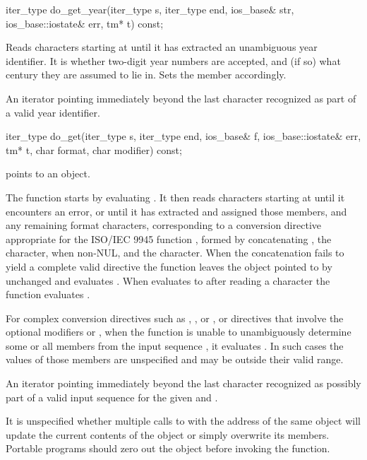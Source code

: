 %
\begin{itemdecl}
iter_type do_get_year(iter_type s, iter_type end, ios_base& str,
                      ios_base::iostate& err, tm* t) const;
\end{itemdecl}

\begin{itemdescr}
\pnum
\effects
Reads characters starting at 
until it has extracted an unambiguous year identifier.
It is
whether two-digit year numbers are accepted,
and (if so) what century they are assumed to lie in.
Sets the  member accordingly.

\pnum
\returns
An iterator pointing immediately beyond
the last character recognized as part of a valid year identifier.
\end{itemdescr}

%
\begin{itemdecl}
iter_type do_get(iter_type s, iter_type end, ios_base& f,
                 ios_base::iostate& err, tm* t, char format, char modifier) const;
\end{itemdecl}

\begin{itemdescr}
\pnum
\expects
{} points to an object.

\pnum
\effects
The function starts by evaluating .
It then reads characters starting at  until it encounters an error, or
until it has extracted and assigned those  members, and
any remaining format characters,
corresponding to a conversion directive appropriate for
the ISO/IEC 9945 function ,
formed by concatenating ,
the  character, when non-NUL, and
the  character.
When the concatenation fails to yield a complete valid directive
the function leaves the object pointed to by  unchanged and
evaluates .
When  evaluates to  after reading a character
the function evaluates .

\pnum
For complex conversion directives
such as , , or , or
directives that involve the optional modifiers  or ,
when the function is unable to unambiguously determine
some or all  members from the input sequence ,
it evaluates .
In such cases the values of those  members are unspecified
and may be outside their valid range.

\pnum
\returns
An iterator pointing immediately beyond
the last character recognized as possibly part of
a valid input sequence for the given  and .

\pnum
\remarks
It is unspecified whether multiple calls to 
with the address of the same  object
will update the current contents of the object or simply overwrite its members.
Portable programs should zero out the object before invoking the function.
\end{itemdescr}

